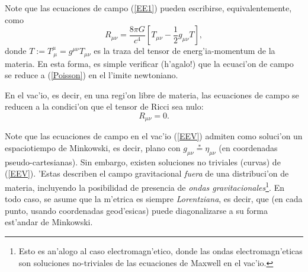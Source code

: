 Note que las ecuaciones de campo (\ref{EE1}) pueden escribirse, equivalentemente, como
\begin{equation}\label{EE3}
 R_{\mu\nu}=\frac{8\pi G}{c^4}\left[ T_{\mu\nu}-\frac{1}{2}g_{\mu\nu}T\right],
\end{equation}
donde $T:=T^\mu_{\ \mu}=g^{\mu\nu}T_{\mu\nu}$ es la traza del tensor de
energ'ia-momentum de la materia. En esta forma, es simple verificar (h'agalo!) que la ecuaci'on de campo se reduce a (\ref{Poisson}) en el l'imite newtoniano.

En el vac'io, es decir, en una regi'on libre de materia, las ecuaciones de
campo se reducen a la condici'on que el tensor de Ricci sea nulo:
\begin{equation}
 R_{\mu\nu}=0. \label{EEV}
\end{equation}

Note que las ecuaciones de campo en el vac'io (\ref{EEV}) admiten como
soluci'on un espaciotiempo de Minkowski, es decir, plano con
$g_{\mu\nu}\stackrel{*}{=}\eta_{\mu\nu}$ (en coordenadas pseudo-cartesianas). Sin embargo, existen soluciones no triviales (curvas) de (\ref{EEV}). 'Estas describen el campo
gravitacional \textit{fuera} de una distribuci'on de materia, incluyendo la posibilidad
de presencia de \textit{ondas gravitacionales}\footnote{Esto es an'alogo al
caso electromagn'etico, donde las ondas electromagn'eticas son soluciones
no-triviales de las ecuaciones de Maxwell en el vac'io.}. En todo caso, se
asume que la m'etrica es siempre \textit{Lorentziana}, es decir, que (en cada
punto, usando coordenadas geod'esicas) puede diagonalizarse a su forma est'andar
de Minkowski.

